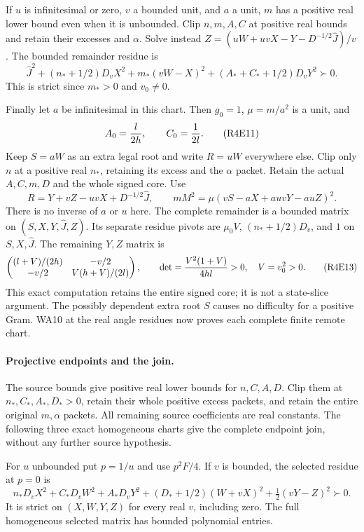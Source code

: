 If $u$ is infinitesimal or zero, $v$ a bounded unit, and $a$ a unit,
$m$ has a positive real lower bound even when it is unbounded.
Clip $n,m,A,C$ at positive real bounds and retain their excesses and
$\alpha$. Solve instead
$Z=(uW+uvX-Y-D^{-1/2}\widehat J)/v$. The bounded remainder residue is
\[
 \widehat J^2+(n_*+1/2)D_vX^2+m_*(vW-X)^2
                  +(A_*+C_*+1/2)D_vY^2\succ0.       \tag{R4E10}
\]
This is strict since $m_*>0$ and $v_0\ne0$.

Finally let $a$ be infinitesimal in this chart. Then $g_0=1$,
$\mu=m/a^2$ is a unit, and
\[
       A_0={l\over2h},\qquad C_0={1\over2l}.          \tag{R4E11}
\]
Keep $S=aW$ as an extra legal root and write $R=uW$ everywhere
else. Clip only $n$ at a positive real $n_*$, retaining its excess
and the $\alpha$ packet. Retain the actual $A,C,m,D$ and the whole
signed core. Use
\[
 R=Y+vZ-uvX+D^{-1/2}\widehat J,\qquad
 mM^2=\mu(vS-aX+auvY-auZ)^2.                         \tag{R4E12}
\]
There is no inverse of $a$ or $u$ here. The complete remainder is
a bounded matrix on $(S,X,Y,\widehat J,Z)$. Its separate residue
pivots are $\mu_0V$, $(n_*+1/2)D_v$, and $1$ on
$S,X,\widehat J$. The remaining $Y,Z$ matrix is
\[
 \begin{pmatrix}
 (l+V)/(2h)&-v/2\\
 -v/2&V(h+V)/(2l)
 \end{pmatrix},\qquad
 \det={V^2(1+V)\over4hl}>0,
 \quad V=v_0^2>0.                                   \tag{R4E13}
\]
This exact computation retains the entire signed core; it is not a
state-slice argument. The possibly dependent extra root $S$ causes
no difficulty for a positive Gram. WA10 at the real angle residues
now proves each complete finite remote chart.

\paragraph{Projective endpoints and the join.}
The source bounds give positive real lower bounds for $n,C,A,D$.
Clip them at $n_*,C_*,A_*,D_*>0$, retain their whole positive
excess packets, and retain the entire original $m,\alpha$ packets.
All remaining source coefficients are real constants. The following
three exact homogeneous charts give the complete endpoint join,
without any further source hypothesis.

For $u$ unbounded put $p=1/u$ and use $p^2F/4$. If $v$ is bounded,
the selected residue at $p=0$ is
\[
 n_*D_vX^2+C_*D_vW^2+A_*D_vY^2
       +(D_*+1/2)(W+vX)^2+\tfrac12(vY-Z)^2\succ0.     \tag{R4E14}
\]
It is strict on $(X,W,Y,Z)$ for every real $v$, including zero.
The full homogeneous selected matrix has bounded polynomial entries.

